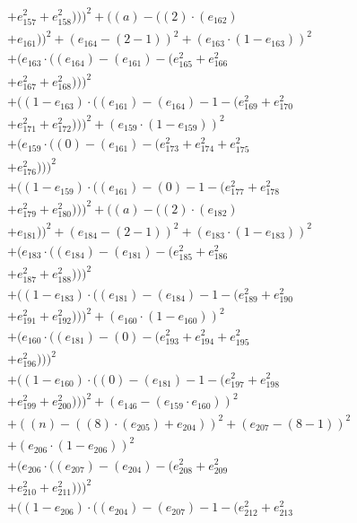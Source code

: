 \documentclass[10pt, a4paper]{article}
\begin{document}
\begin{align*}
& + e_{157}^{2} + e_{158}^{2})))^{2} + ((a) - ((2)  \cdot  (e_{162}) \\
& + e_{161}))^{2} + (e_{164} - (2 - 1))^{2} + (e_{163}  \cdot  (1 - e_{163}))^{2} \\
& + (e_{163}  \cdot  ((e_{164}) - (e_{161}) - (e_{165}^{2} + e_{166}^{2} \\
& + e_{167}^{2} + e_{168}^{2})))^{2} \\
& + ((1 - e_{163})  \cdot  ((e_{161}) - (e_{164}) - 1 - (e_{169}^{2} + e_{170}^{2} \\
& + e_{171}^{2} + e_{172}^{2})))^{2} + (e_{159}  \cdot  (1 - e_{159}))^{2} \\
& + (e_{159}  \cdot  ((0) - (e_{161}) - (e_{173}^{2} + e_{174}^{2} + e_{175}^{2} \\
& + e_{176}^{2})))^{2} \\
& + ((1 - e_{159})  \cdot  ((e_{161}) - (0) - 1 - (e_{177}^{2} + e_{178}^{2} \\
& + e_{179}^{2} + e_{180}^{2})))^{2} + ((a) - ((2)  \cdot  (e_{182}) \\
& + e_{181}))^{2} + (e_{184} - (2 - 1))^{2} + (e_{183}  \cdot  (1 - e_{183}))^{2} \\
& + (e_{183}  \cdot  ((e_{184}) - (e_{181}) - (e_{185}^{2} + e_{186}^{2} \\
& + e_{187}^{2} + e_{188}^{2})))^{2} \\
& + ((1 - e_{183})  \cdot  ((e_{181}) - (e_{184}) - 1 - (e_{189}^{2} + e_{190}^{2} \\
& + e_{191}^{2} + e_{192}^{2})))^{2} + (e_{160}  \cdot  (1 - e_{160}))^{2} \\
& + (e_{160}  \cdot  ((e_{181}) - (0) - (e_{193}^{2} + e_{194}^{2} + e_{195}^{2} \\
& + e_{196}^{2})))^{2} \\
& + ((1 - e_{160})  \cdot  ((0) - (e_{181}) - 1 - (e_{197}^{2} + e_{198}^{2} \\
& + e_{199}^{2} + e_{200}^{2})))^{2} + (e_{146} - (e_{159}  \cdot  e_{160}))^{2} \\
& + ((n) - ((8)  \cdot  (e_{205}) + e_{204}))^{2} + (e_{207} - (8 - 1))^{2} \\
& + (e_{206}  \cdot  (1 - e_{206}))^{2} \\
& + (e_{206}  \cdot  ((e_{207}) - (e_{204}) - (e_{208}^{2} + e_{209}^{2} \\
& + e_{210}^{2} + e_{211}^{2})))^{2} \\
& + ((1 - e_{206})  \cdot  ((e_{204}) - (e_{207}) - 1 - (e_{212}^{2} + e_{213}^{2} \\

\end{align*}
\end{document}
